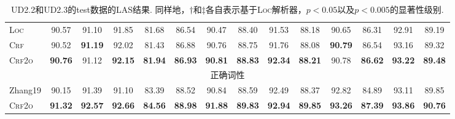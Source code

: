\begin{table*}[tb]
\begin{tabular}{lccccccccccccc}
        \textsc{Loc}                  & 90.57          & 91.10          & 91.85                            & 81.68                           & 86.54                           & 90.47                            & 88.40                           & 91.53                            & 88.18                            & 90.65                           & 86.31                            & 92.91                            & 89.19                            \\
        \textsc{Crf}                  & 90.52          & \textbf{91.19} & 92.02                            & 81.43                           & 86.88\rlap{$^\dagger$}          & 90.76\rlap{$^\dagger$}           & 88.75                           & 91.76                            & 88.08                            & \textbf{90.79}                  & 86.54                            & 93.16\rlap{$^\ddagger$}          & 89.32\rlap{$^\ddagger$}          \\
        \textsc{Crf2o}                & \textbf{90.76} & 91.12          & \textbf{92.15}\rlap{$^\ddagger$} & \textbf{81.94}                  & \textbf{86.93}\rlap{$^\dagger$} & \textbf{90.81}\rlap{$^\ddagger$} & \textbf{88.83}\rlap{$^\dagger$} & \textbf{92.34}\rlap{$^\ddagger$} & \textbf{88.21}\rlap{$^\dagger$}  & 90.78                           & \textbf{86.62}                   & \textbf{93.22}\rlap{$^\ddagger$} & \textbf{89.48}\rlap{$^\ddagger$} \\
        \multicolumn{14}{c}{正确词性}                                                                                                                                                                                                                                                                                                                                                                                                                                \\[1pt]
        Zhang19                       & 90.15          & 91.39          & 91.10                            & 83.39                           & 88.52                           & 90.84                            & 88.59                           & 92.49                            & 88.37                            & 92.82                           & 84.89                            & 93.11                            & 89.85                            \\
        \textsc{Crf2o}                & \textbf{91.32} & \textbf{92.57} & \textbf{92.66}                   & \textbf{84.56}                  & \textbf{88.98}                  & \textbf{91.88}                   & \textbf{89.83}                  & \textbf{92.94}                   & \textbf{89.85}                   & \textbf{93.26}                  & \textbf{87.39}                   & \textbf{93.86}                   & \textbf{90.76}                   \\
        \bottomrule
    \end{tabular}
    \caption{UD2.2和UD2.3的test数据的LAS结果.
        同样地，$\dagger$和$\ddagger$各自表示基于\textsc{Loc}解析器，$p<0.05$以及$p<0.005$的显著性级别. }
    \label{table:ud-test}
\end{table*}

